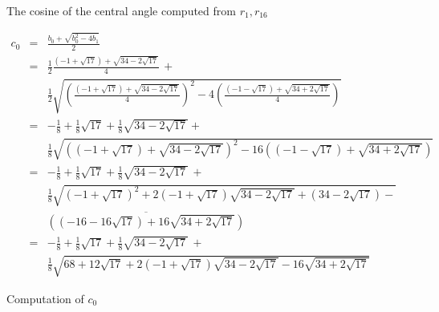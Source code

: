 \begin{figure}[b]
\begin{center}
\end{center}
\caption{The cosine of the central angle computed from $r_1,r_{16}$}\label{f.hept-cosine}
\end{figure}

\begin{figure}[t]
\begin{eqnarray*}
c_0&=&\frac{b_0+\sqrt{b_0^2-4b_1}}{2}\\
&=&\frac{1}{2}
     \frac{
     (-1+\sqrt{17}) + 
     \sqrt{34-2\sqrt{17}}
   }{4}\,+ \\
&& 
    \frac{1}{2}
       \sqrt{\left(\frac{
     (-1+\sqrt{17}) + 
     \sqrt{34-2\sqrt{17}}
   }{4}\right)^2-4\left(\frac{
     (-1-\sqrt{17}) + 
     \sqrt{34+2\sqrt{17}}
   }{4}\right)}
   \\
&=&-\frac{1}{8}+\frac{1}{8}\sqrt{17} + 
     \frac{1}{8}\sqrt{34-2\sqrt{17}}
    + \\
   &&
     \frac{1}{8}\sqrt{
     \left(
     (-1+\sqrt{17}) + 
     \sqrt{34-2\sqrt{17}}
   \right)^2-16\left(
     (-1-\sqrt{17}) + 
     \sqrt{34+2\sqrt{17}}
   \right)}
\\
&=&-\frac{1}{8}+\frac{1}{8}\sqrt{17} + 
     \frac{1}{8}\sqrt{34-2\sqrt{17}}
   \, + \\
   &&
     \frac{1}{8}\sqrt{
     (-1+\sqrt{17})^2 + 
     2(-1+\sqrt{17})\sqrt{34-2\sqrt{17}}+
     (34-2\sqrt{17})
   -}\\
   &&\overline{
     \left((-16-16\sqrt{17}) + 
     16\sqrt{34+2\sqrt{17}}\right)
   }
\\
&=&-\frac{1}{8}+\frac{1}{8}\sqrt{17} + 
     \frac{1}{8}\sqrt{34-2\sqrt{17}}
    \,+ \\
   &&
     \frac{1}{8}\sqrt{
     68+12\sqrt{17} + 
     2(-1+\sqrt{17})\sqrt{34-2\sqrt{17}}
   -16
     \sqrt{34+2\sqrt{17}}
   }
\end{eqnarray*}
\caption{Computation of $c_0$}\label{fig.c0}
\end{figure}

